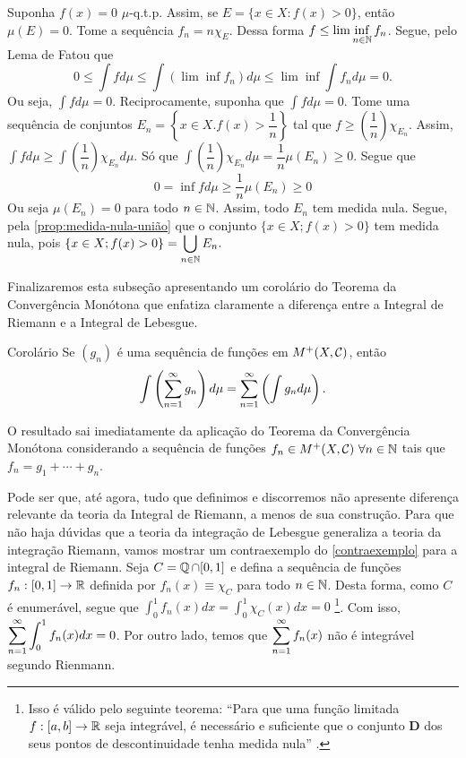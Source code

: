 \begin{prova}
	Suponha $f(x) = 0$ $\mu$-q.t.p.
	Assim, se $E = \{ x \in X: f(x) > 0\}$, então $\mu(E) = 0$.
	Tome a sequência $f_n = n\chi_E$.
	Dessa forma $\displaystyle f \leq \lim \inf_{n \in \operatorname{\mathbb{N}}} f_n$.
	Segue, pelo Lema de Fatou que
	$$
	0 
	\leq
	\int f d\mu
	\leq
	\int (\lim \inf f_n) d\mu
	\leq
	\lim \inf \int f_n d\mu
	=
	0.
	$$
	Ou seja, $\displaystyle\int f d\mu = 0$.
	Reciprocamente, suponha que $\displaystyle\int f d\mu = 0$.
	Tome uma sequência de conjuntos 
	$E_n = \left\{ x \in X. f(x) > \dfrac{1}{n}\right\}$ tal que 
	$f \geq \left(\dfrac{1}{n}\right)\chi_{E_n}$.
	Assim, $\int f d\mu \geq \int \left(\dfrac{1}{n}\right)\chi_{E_n} d\mu$.
	Só que 
	$\int \left(\dfrac{1}{n}\right)\chi_{E_n} d\mu
	= \dfrac{1}{n}\mu(E_n) \geq 0.
	$
	Segue que
	$$
	0 = \inf f d\mu 
	\geq 
	\dfrac{1}{n}\mu(E_n) \geq 0
	$$
	Ou seja $\mu(E_n) = 0$ para todo $n \in \operatorname{\mathbb{N}}$.
	Assim, todo $E_n$ tem medida nula.
	Segue, pela \ref{prop:medida-nula-união}
	que o conjunto $\{x \in X; f(x) > 0\}$ tem medida nula, pois
	$\{x \in X; f(x) > 0\}
	=
	\displaystyle
	\bigcup_{n \in \operatorname{\mathbb{N}}} E_n.
	$
	
\end{prova}
Finalizaremos esta subseção apresentando um corolário do Teorema da Convergência Monótona que enfatiza claramente a diferença entre a Integral de Riemann e a Integral de Lebesgue.

\begin{env}{Corolário}
	\label{contraexemplo}
	Se $(g_n)$ é uma sequência de funções em $M^+(X, \operatorname{\mathcal{C}})$, então 
	$$
	\int \left(\displaystyle \sum_{n = 1} ^\infty g_n\right)d\mu
	=
	\displaystyle \sum_{n = 1} ^\infty \left(\int g_n d\mu\right).
	$$
\end{env}
\begin{prova}
	O resultado sai imediatamente da aplicação do Teorema da Convergência Monótona considerando a sequência de funções $f_n \in M^+(X, \operatorname{\mathcal{C}})\ \forall n \in \operatorname{\mathbb{N}}$ tais que
	$f_n = g_1 + \cdots + g_n  $.
\end{prova}

Pode ser que, até agora, tudo que definimos e discorremos não apresente diferença relevante da teoria da Integral de Riemann, a menos de sua construção.
Para que não haja dúvidas que a teoria da integração de Lebesgue generaliza a teoria da integração Riemann, vamos mostrar um contraexemplo do \ref{contraexemplo} para a integral de Riemann. 
Seja $C = \operatorname{\mathbb{Q}} \cap [0,1]$ e defina a sequência de funções $f_n: [0,1] \to \mathbb{R}$ definida por $f_n(x) \equiv \chi_C$ para todo $n \in \operatorname{\mathbb{N}}$.
Desta forma, como $C$ é enumerável, segue que $\displaystyle \int_{0}^{1} f_n(x)dx = \int_{0}^{1} \chi_C(x) dx = 0$
\footnote{Isso é válido pelo seguinte teorema:
	\enquote{Para que uma função limitada $f : [a, b] \to \mathbb{R}$ seja
		integrável, é necessário e suficiente que o conjunto \textbf{D} dos seus
		pontos de descontinuidade tenha medida nula} \cite[p.344]{elon}.
}.
Com isso, $\displaystyle \sum_{n = 1}^\infty \int_{0}^{1} f_n(x)dx = 0$.
Por outro lado, temos que
$
\displaystyle \sum_{n = 1}^\infty f_n(x)
$
não é integrável segundo Rienmann.
